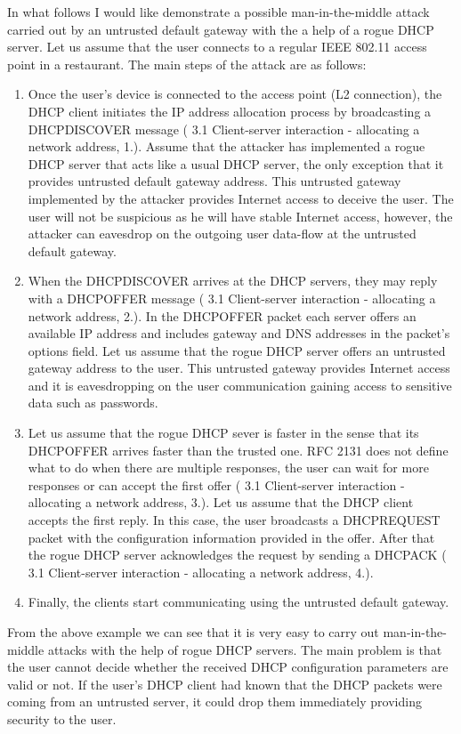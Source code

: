 \documentclass[letterpaper, 10 pt, conference]{ieeeconf}  %
\begin{document}
In what follows I would like demonstrate a possible man-in-the-middle attack carried out by an untrusted default gateway with the a help of a rogue DHCP server. Let us assume that the user connects to a regular IEEE 802.11 access point in a restaurant. The main steps of the attack are as follows:
\begin{enumerate}
\item Once the user's device is connected to the access point (L2 connection), the DHCP client initiates the IP address allocation process by broadcasting a DHCPDISCOVER message (\cite{dhcprfc} 3.1 Client-server interaction - allocating a network address, 1.). Assume that the attacker has implemented a rogue DHCP server that acts like a usual DHCP server, the only exception that it provides untrusted default gateway address. This untrusted gateway implemented by the attacker provides Internet access to deceive the user. The user will not be suspicious as he will have stable Internet access, however, the attacker can eavesdrop on the outgoing user data-flow at the untrusted default gateway.
\item When the DHCPDISCOVER arrives at the DHCP servers, they may reply with a DHCPOFFER message (\cite{dhcprfc} 3.1 Client-server interaction - allocating a network address, 2.). In the DHCPOFFER packet each server offers an available IP address and includes gateway and DNS addresses in the packet's options field. Let us assume that the rogue DHCP server offers an untrusted gateway address to the user. This untrusted gateway provides Internet access and it is eavesdropping on the user communication gaining access to sensitive data such as passwords.
\item Let us assume that the rogue DHCP sever is faster in the sense that its DHCPOFFER arrives faster than the trusted one. RFC 2131 does not define what to do when there are multiple responses, the user can wait for more responses or can accept the first offer (\cite{dhcprfc} 3.1 Client-server interaction - allocating a network address, 3.). Let us assume that the DHCP client accepts the first reply. In this case, the user broadcasts a DHCPREQUEST packet with the configuration information provided in the offer. After that the rogue DHCP server acknowledges the request by sending a DHCPACK (\cite{dhcprfc} 3.1 Client-server interaction - allocating a network address, 4.).
\item Finally, the clients start communicating using the untrusted default gateway.
\end{enumerate}
From the above example we can see that it is very easy to carry out man-in-the-middle attacks with the help of rogue DHCP servers. The main problem is that the user cannot decide whether the received DHCP configuration parameters are valid or not. If the user's DHCP client had known that the DHCP packets were coming from an untrusted server, it could drop them immediately providing security to the user. 
\end{document}
